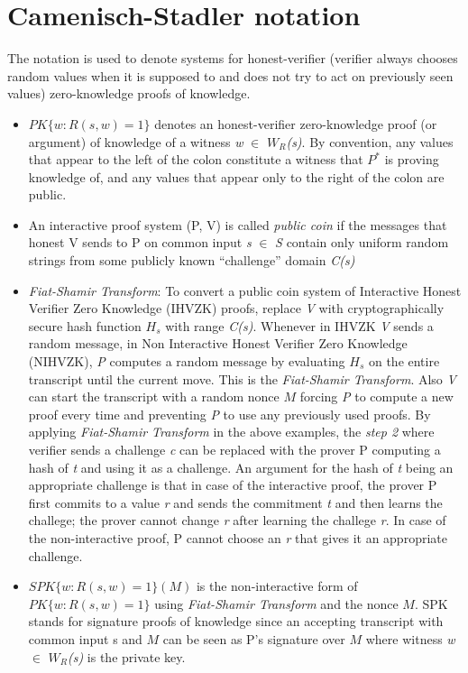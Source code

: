 \documentclass[a4paper]{article}
\newcommand{\quotes}[1]{``#1''}
\begin{document}
\section{Camenisch-Stadler notation}
The notation is used to denote systems for honest-verifier (verifier always chooses random values when it is supposed to and does not try to act on previously seen values) zero-knowledge proofs of knowledge.
\begin{itemize}
  \item $PK\{w : R(s,w) = 1\}$ denotes an honest-verifier zero-knowledge proof (or argument) of knowledge of a witness \textit{w} $\in$ \textit{$W_R$(s)}. By convention, any values that appear to the left of the colon constitute a witness that ${P^{*}}$ is proving knowledge of, and any values that appear only to the right of the colon are public.
  \item An interactive proof system (P, V) is called \emph{public coin} if the messages that honest V sends to P on common input \textit{s} $\in$ \textit{S} contain only uniform random strings from some publicly known \quotes{challenge} domain \textit{C(s)} 
  \item \emph{Fiat-Shamir Transform}: To convert a public coin system of Interactive Honest Verifier Zero Knowledge (IHVZK) proofs, replace \textit{V} with cryptographically secure hash function $H_s$ with range \textit{C(s)}. Whenever in IHVZK \textit{V} sends a random message, in Non Interactive Honest Verifier Zero Knowledge (NIHVZK), \textit{P} computes a random message by evaluating $H_s$ on the entire transcript until the current move. This is the \emph{Fiat-Shamir Transform}. Also \textit{V} can start the transcript with a random nonce $M$ forcing \textit{P} to compute a new proof every time and preventing \textit{P} to use any previously used proofs. By applying \emph{Fiat-Shamir Transform} in the above examples, the \textit{step 2} where verifier sends a challenge \textit{c} can be replaced with the prover P computing a hash of \textit{t} and using it as a challenge. An argument for the hash of \textit{t} being an appropriate challenge is that in case of the interactive proof, the prover P first commits to a value \textit{r} and sends the commitment \textit{t} and then learns the challege; the prover cannot change \textit{r} after learning the challege \textit{r}. In case of the non-interactive proof, P cannot choose an \textit{r} that gives it an appropriate challenge.   
  \item $SPK\{w : R(s,w) = 1\}(M)$ is the non-interactive form of $PK\{w : R(s,w) = 1\}$ using \emph{Fiat-Shamir Transform} and the nonce $M$. SPK stands for signature proofs of knowledge since an accepting transcript with common input s and $M$ can be seen as P's signature over $M$ where witness \textit{w} $\in$ \textit{$W_R$(s)} is the private key. 
\end{itemize}
\end{document}
